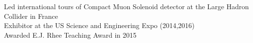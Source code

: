 \documentclass[a4paper,11pt]{memoir} %
\begin{document}



\bluebullet Led international tours of Compact Muon Solenoid detector at the Large Hadron Collider in France\\
\bluebullet Exhibitor at the US Science and Engineering Expo (2014,2016)\\
\bluebullet Awarded E.J. Rhee Teaching Award in 2015\\

\Sep %

\end{document}
